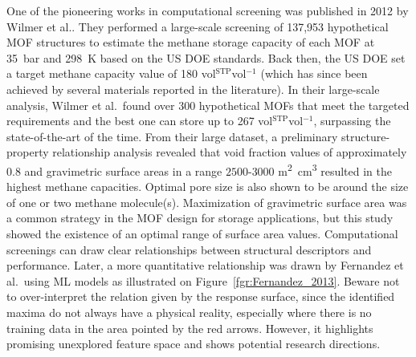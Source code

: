 \documentclass[main.tex]{subfiles}
\begin{document}
One of the pioneering works in computational screening was published in 2012 by Wilmer et al.\autocite{Wilmer_2012}. They performed a large-scale screening of 137,953 hypothetical MOF structures to estimate the methane storage capacity of each MOF at \SI{35}{\bar} and \SI{298}{\kelvin} based on the US DOE standards. Back then, the US DOE set a target methane capacity value of 180 vol{\footnotesize$^\mathrm{STP}$}vol$^{-1}$ (which has since been achieved by several materials reported in the literature). In their large-scale analysis, Wilmer et al.\ found over 300 hypothetical MOFs that meet the targeted requirements and the best one can store up to 267 vol{\footnotesize$^\mathrm{STP}$}vol$^{-1}$, surpassing the state-of-the-art of the time. From their large dataset, a preliminary structure-property relationship analysis revealed that void fraction values of approximately 0.8 and gravimetric surface areas in a range $2500$-$3000$ \si{\square\meter\cubic\centi\meter} resulted in the highest methane capacities. Optimal pore size is also shown to be around the size of one or two methane molecule(s). Maximization of gravimetric surface area was a common strategy in the MOF design for storage applications, but this study showed the existence of an optimal range of surface area values. Computational screenings can draw clear relationships between structural descriptors and performance. Later, a more quantitative relationship was drawn by Fernandez et al.\ using ML models as illustrated on Figure~\ref{fgr:Fernandez_2013}. Beware not to over-interpret the relation given by the response surface, since the identified maxima do not always have a physical reality, especially where there is no training data in the area pointed by the red arrows. However, it highlights promising unexplored feature space and shows potential research directions.
\end{document}
